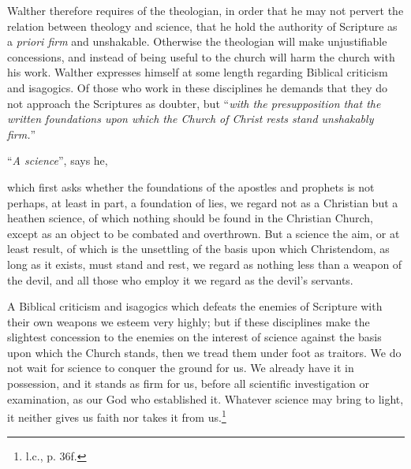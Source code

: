                 Walther therefore requires of the theologian, in order that he may not pervert the relation between theology and science, that he hold the authority of Scripture as a \textit{priori firm} and unshakable.  Otherwise the theologian will make unjustifiable concessions, and instead of being useful to the church will harm the church with his work.  Walther expresses himself at some length regarding Biblical criticism and isagogics.  Of those who work in these disciplines he demands that they do not approach the Scriptures as doubter, but “\textit{with the presupposition that the written foundations upon which the Church of Christ rests stand unshakably firm.}” \par “\textit{A science}”, says he,\begin{fancyquotes}which first asks whether the foundations of the apostles and prophets is not perhaps, at least in part, a foundation of lies, we regard not as a Christian but a heathen science, of which nothing should be found in the Christian Church, except as an object to be combated and overthrown.
                But a science the aim, or at least result, of which is the unsettling of the basis upon which Christendom, as long as it exists, must stand and rest, we regard as nothing less than a weapon of the devil, and all those who employ it we regard as the devil’s servants. \par A Biblical criticism and isagogics which defeats the enemies of Scripture with their own weapons we esteem very highly; but if these disciplines make the slightest concession to the enemies on the interest of science against the basis upon which the Church stands, then we tread them under foot as traitors.  We do not wait for science to conquer the ground for us.  We already have it in possession, and it stands as firm for us, before all scientific investigation or examination, as our God who established it.  Whatever science may bring to light, it neither gives us faith nor takes it from us.\footnote{l.c., p. 36f.}\end{fancyquotes}

